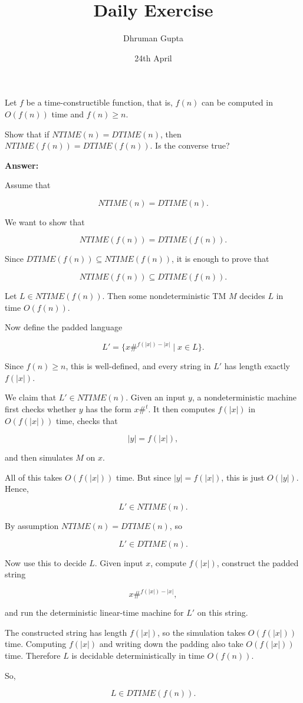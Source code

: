 \documentclass[11pt]{article}
\title{Daily Exercise}
\author{Dhruman Gupta}
\date{24th April}
\begin{document}

Let $f$ be a time-constructible function, that is, $f(n)$ can be computed in $O(f(n))$ time and $f(n) \geq n$.

Show that if $NTIME(n) = DTIME(n)$, then $NTIME(f(n)) = DTIME(f(n))$. Is the converse true?

\textbf{Answer:}

Assume that

\[
NTIME(n) = DTIME(n).
\]

We want to show that

\[
NTIME(f(n)) = DTIME(f(n)).
\]

Since $DTIME(f(n)) \subseteq NTIME(f(n))$, it is enough to prove that

\[
NTIME(f(n)) \subseteq DTIME(f(n)).
\]

Let $L \in NTIME(f(n))$. Then some nondeterministic TM $M$ decides $L$ in time $O(f(n))$.

Now define the padded language

\[
L' = \{x\#^{f(|x|)-|x|} \mid x \in L\}.
\]

Since $f(n) \geq n$, this is well-defined, and every string in $L'$ has length exactly $f(|x|)$.

We claim that $L' \in NTIME(n)$. Given an input $y$, a nondeterministic machine first checks whether $y$ has the form $x\#^t$. It then computes $f(|x|)$ in $O(f(|x|))$ time, checks that

\[
|y| = f(|x|),
\]

and then simulates $M$ on $x$.

All of this takes $O(f(|x|))$ time. But since $|y| = f(|x|)$, this is just $O(|y|)$. Hence,

\[
L' \in NTIME(n).
\]

By assumption $NTIME(n) = DTIME(n)$, so

\[
L' \in DTIME(n).
\]

Now use this to decide $L$. Given input $x$, compute $f(|x|)$, construct the padded string

\[
x\#^{f(|x|)-|x|},
\]

and run the deterministic linear-time machine for $L'$ on this string.

The constructed string has length $f(|x|)$, so the simulation takes $O(f(|x|))$ time. Computing $f(|x|)$ and writing down the padding also take $O(f(|x|))$ time. Therefore $L$ is decidable deterministically in time $O(f(n))$.

So,

\[
L \in DTIME(f(n)).
\]
\end{document}
